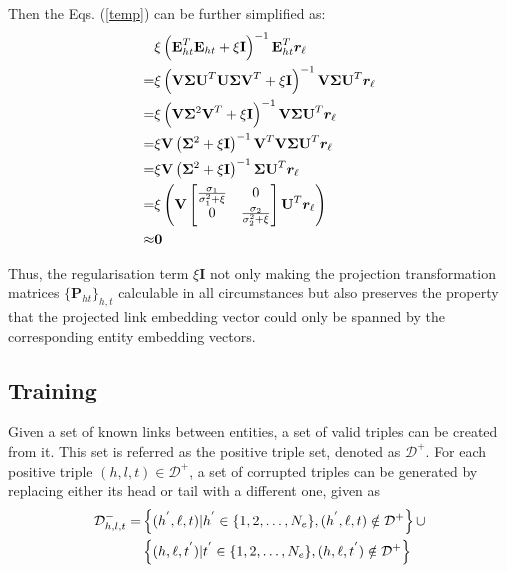 \documentclass[9pt]{sig-alternate-05-2015}
\begin{document}
Then the Eqs. (\ref{temp}) can be further simplified as:
\begin{align}
& \xi \left(\textbf{E}_{ht}^{T} \textbf{E}_{ht} + \xi \textbf{I}\right )^{-1} \textbf{E}_{ht}^{T} \bm{r}_{\ell} \notag \\
=& \xi \left(\textbf{V} \mathbf{\Sigma} \textbf{U}^{T}  \textbf{U} \mathbf{\Sigma} \textbf{V}^{T} + \xi \textbf{I}\right )^{-1} \textbf{V} \mathbf{\Sigma} \textbf{U}^{T} \bm{r}_{\ell} \notag \\
=& \xi \left(\textbf{V} \mathbf{\Sigma}^2 \textbf{V}^{T} + \xi \textbf{I}\right )^{-1} \textbf{V} \mathbf{\Sigma} \textbf{U}^{T} \bm{r}_{\ell} \notag \\
=& \xi \textbf{V} \left(\mathbf{\Sigma}^2 + \xi \textbf{I} \right)^{-1} \textbf{V}^{T} \textbf{V} \mathbf{\Sigma} \textbf{U}^{T} \bm{r}_{\ell} \notag \\
=& \xi \textbf{V} \left(\mathbf{\Sigma}^2 + \xi \textbf{I} \right)^{-1} \mathbf{\Sigma} \textbf{U}^{T} \bm{r}_{\ell} \notag \\
=& \xi \left( \textbf{V} \begin{bmatrix} \frac{\sigma_1}{\sigma_1^2 + \xi} & 0 \\ 0 & \frac{\sigma_2}{\sigma_2^2 + \xi}   \end{bmatrix} \textbf{U}^{T} \bm{r}_{\ell}  \right)\notag \\
\approx & \bm{0}
\end{align}

Thus, the regularisation term $\xi \textbf{I}$ not only making the projection transformation matrices $\{\textbf{P}_{ht}\}_{h,t}$ calculable in all circumstances but also preserves the property that the projected link embedding vector  could only be spanned by the corresponding entity embedding vectors.

\subsection{Training}
Given a set of known links between entities, a set of valid triples can be created from it. This set is referred as the positive triple  set, denoted as $\mathcal{D}^+$. For each positive triple $(h,l,t)\in\mathcal{D}^+$, a set of  corrupted triples can be generated by replacing either its head or tail  with a different one, given as
\begin{align*}
\small
\mathcal{D}^{-}_{h,l,t} = &  \left\{ (h^{'},\ell,t)  |  h^{'} \in \{ 1,2,\ldots, N_e\}, (h^{'},\ell,t)\notin \mathcal{D}^+ \right\} \cup \\
 &  \left\{ (h,\ell,t^{'})  |   t^{'} \in \{ 1,2,\ldots, N_e\},  (h,\ell,t^{'}) \notin \mathcal{D}^+\right\}
\end{align*}
\end{document}
